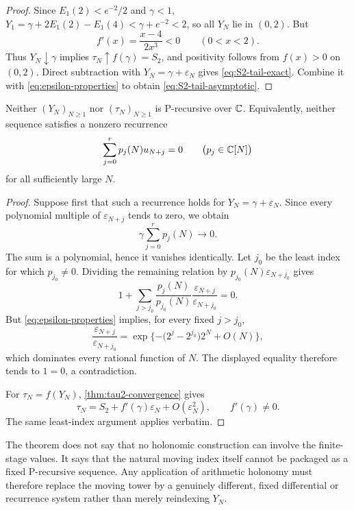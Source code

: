 \begin{proof}
Since \(E_1(2)<e^{-2}/2\) and \(\gamma<1\),
\(Y_1=\gamma+2E_1(2)-E_1(4)<\gamma+e^{-2}<2\), so all \(Y_N\) lie in
\((0,2)\).  But
\[
 f'(x)=\frac{x-4}{2x^3}<0\qquad(0<x<2).
\]
Thus \(Y_N\downarrow\gamma\) implies \(\tau_N\uparrow f(\gamma)=S_2\), and
positivity follows from \(f(x)>0\) on \((0,2)\).  Direct subtraction with
\(Y_N=\gamma+\varepsilon_N\) gives \eqref{eq:S2-tail-exact}.  Combine it
with \eqref{eq:epsilon-properties} to obtain
\eqref{eq:S2-tail-asymptotic}.
\end{proof}

\begin{theorem}
\label{thm:non-p-recursive}
Neither \((Y_N)_{N\ge1}\) nor \((\tau_N)_{N\ge1}\) is P-recursive over
\(\mathbb C\).  Equivalently, neither sequence satisfies a nonzero recurrence
\[
 \sum_{j=0}^r p_j(N)u_{N+j}=0
 \qquad\bigl(p_j\in\mathbb C[N]\bigr)
\]
for all sufficiently large \(N\).
\end{theorem}

\begin{proof}
Suppose first that such a recurrence holds for \(Y_N=\gamma+\varepsilon_N\).
Since every polynomial multiple of \(\varepsilon_{N+j}\) tends to zero, we
obtain
\[
 \gamma\sum_{j=0}^rp_j(N)\longrightarrow0.
\]
The sum is a polynomial, hence it vanishes identically.  Let \(j_0\) be the
least index for which \(p_{j_0}\ne0\).  Dividing the remaining relation by
\(p_{j_0}(N)\varepsilon_{N+j_0}\) gives
\[
 1+\sum_{j>j_0}
 \frac{p_j(N)}{p_{j_0}(N)}
 \frac{\varepsilon_{N+j}}{\varepsilon_{N+j_0}}=0.
\]
But \eqref{eq:epsilon-properties} implies, for every fixed \(j>j_0\),
\[
 \frac{\varepsilon_{N+j}}{\varepsilon_{N+j_0}}
 =\exp\{-\bigl(2^j-2^{j_0}\bigr)2^N+O(N)\},
\]
which dominates every rational function of \(N\).  The displayed equality
therefore tends to \(1=0\), a contradiction.

For \(\tau_N=f(Y_N)\), \cref{thm:tau2-convergence} gives
\[
 \tau_N=S_2+f'(\gamma)\varepsilon_N+O(\varepsilon_N^2),
 \qquad f'(\gamma)\ne0.
\]
The same least-index argument applies verbatim.
\end{proof}

\begin{remark}
The theorem does not say that no holonomic construction can involve the
finite-stage values.  It says that the natural moving index itself cannot be
packaged as a fixed P-recursive sequence.  Any application of arithmetic
holonomy must therefore replace the moving tower by a genuinely different,
fixed differential or recurrence system rather than merely reindexing
\(Y_N\).
\end{remark}


